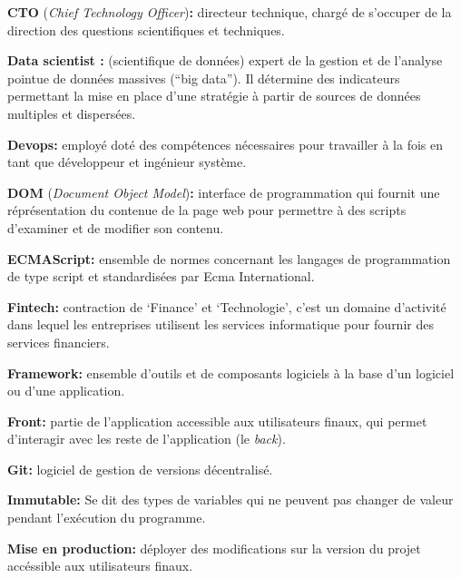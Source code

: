 \bigskip

\textbf{CTO} (\emph{Chief Technology Officer})\textbf{:} directeur
technique, chargé de s'occuper de la direction des questions
scientifiques et techniques.

\bigskip

\textbf{Data scientist :} (scientifique de données) expert de la gestion
et de l'analyse pointue de données massives (``big data''). Il détermine
des indicateurs permettant la mise en place d'une stratégie à partir de
sources de données multiples et dispersées.

\bigskip

\textbf{Devops:} employé doté des compétences nécessaires pour
travailler à la fois en tant que développeur et ingénieur système.

\bigskip

\textbf{DOM} (\emph{Document Object Model})\textbf{:} interface de
programmation qui fournit une réprésentation du contenue de la page web
pour permettre à des scripts d'examiner et de modifier son contenu.

\bigskip

\textbf{ECMAScript:} ensemble de normes concernant les langages de
programmation de type script et standardisées par Ecma International.

\bigskip

\textbf{Fintech:} contraction de `Finance' et `Technologie', c'est un
domaine d'activité dans lequel les entreprises utilisent les services
informatique pour fournir des services financiers.

\bigskip

\textbf{Framework:} ensemble d'outils et de composants logiciels à la
base d'un logiciel ou d'une application.

\bigskip

\textbf{Front:} partie de l'application accessible aux utilisateurs
finaux, qui permet d'interagir avec les reste de l'application (le
\emph{back}).

\bigskip

\textbf{Git:} logiciel de gestion de versions décentralisé.

\bigskip

\textbf{Immutable:} Se dit des types de variables qui ne peuvent pas
changer de valeur pendant l'exécution du programme.

\bigskip

\textbf{Mise en production:} déployer des modifications sur la version
du projet accéssible aux utilisateurs finaux.

